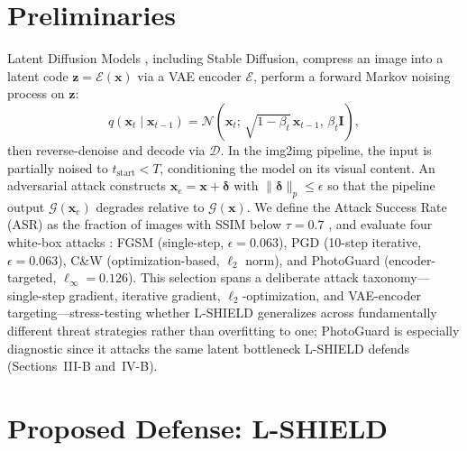 \documentclass[conference]{IEEEtran}
\begin{document}
\section{Preliminaries}

Latent Diffusion Models \cite{ho2020denoising,rombach2022high}, including
Stable Diffusion, compress an image into a latent code
$\mathbf{z}\!=\!\mathcal{E}(\mathbf{x})$ via a VAE encoder $\mathcal{E}$,
perform a forward Markov noising process on $\mathbf{z}$:
\begin{equation}
  q(\mathbf{x}_t \mid \mathbf{x}_{t-1}) =
  \mathcal{N}\!\left(\mathbf{x}_t;\,\sqrt{1-\beta_t}\,\mathbf{x}_{t-1},\,
  \beta_t \mathbf{I}\right),
\end{equation}
then reverse-denoise and decode via $\mathcal{D}$. In the img2img pipeline,
the input is partially noised to $t_{\text{start}} < T$, conditioning the
model on its visual content. An adversarial attack constructs
$\mathbf{x}_e = \mathbf{x} + \boldsymbol{\delta}$ with
$\|\boldsymbol{\delta}\|_p \leq \epsilon$ so that the pipeline output
$\mathcal{G}(\mathbf{x}_e)$ degrades relative to $\mathcal{G}(\mathbf{x})$.
We define the Attack Success Rate (ASR) as the fraction of images with SSIM
below $\tau\!=\!0.7$ \cite{salman2023raising}, and evaluate four white-box
attacks \cite{costa2024deep}: FGSM \cite{goodfellow2015explaining} (single-step,
$\epsilon\!=\!0.063$), PGD \cite{madry2018towards} (10-step iterative,
$\epsilon\!=\!0.063$), C\&W \cite{carlini2017evaluating} (optimization-based,
$\ell_2$ norm), and PhotoGuard \cite{salman2023raising} (encoder-targeted,
$\ell_\infty\!=\!0.126$).
This selection spans a deliberate attack taxonomy---single-step gradient, iterative
gradient, $\ell_2$-optimization, and VAE-encoder targeting---stress-testing
whether L-SHIELD generalizes across fundamentally different threat strategies
rather than overfitting to one; PhotoGuard is especially diagnostic since it attacks
the same latent bottleneck L-SHIELD defends (Sections~III-B and~IV-B).

\section{Proposed Defense: L-SHIELD}
\end{document}
